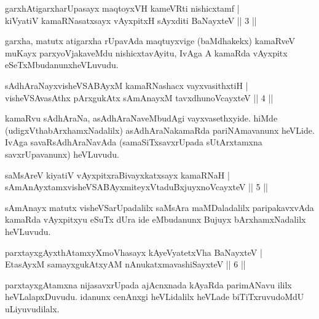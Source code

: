 
\begin{shl}
garxhAtigarxharUpasayx maqtoyxVH kameVRti nishicxtamf |\\
kiVyatiV kamaRNasatxsayx vAyxpitxH sAyxditi BaNayxteV \hfill || 3 ||
\end{shl}

\begin{artha}
garxha, matutx atigarxha rUpavAda maqtuyxvige (baMdhakekx) kamaRveV muKayx parxyoVjakaveMdu nishicxtavAyitu, IvAga A kamaRda vAyxpitx eSeTxMbudanunx\break heVLuvudu.
\end{artha}

\begin{shl}
sAdhAraNayxvisheVSABAyxM kamaRNashacx vayxvasithxtiH |\\
visheVSAvasAthx pArxgukAtx sAmAnayxM tavxdhunoVcayxteV \hfill || 4 ||
\end{shl}

\begin{artha}
kamaRvu sAdhAraNa, asAdhAraNaveMbudAgi vayxvasethxyide. hiMde (udigxVtha\-bArxhamxNadalilx) asAdhAraNakamaRda pariNAmavanunx heVLide. IvAga savaRsAdhAraNavAda (samaSiTxsavxrUpada sUtArxtamxna savxrUpavanunx) heVLuvudu.
\end{artha}


\begin{shl}
saMsAreV kiyatiV vAyxpitxraBivayxkatxsayx kamaRNaH |\\
sAmAnAyxtamxvisheVSABAyxmiteyxVtaduBxjuyxnoVcayxteV \hfill || 5 ||
\end{shl}

\begin{artha}
sAmAnayx matutx visheVSarUpadalilx saMsAra maMDaladalilx paripakavxvAda kamaRda vAyxpitxyu eSuTx dUra ide eMbudanunx Bujuyx bArxhamxNadalilx heVLuvudu.
\end{artha}

\begin{shl}
parxtayxgAyxthAtamxyXmoVhasayx kAyeVyatetxVha BaNayxteV |\\
EtasAyxM samayxgukAtxyAM nAnukatxmavashiSayxteV \hfill || 6 ||
\end{shl}

\begin{artha}
parxtayxgAtamxna nijasavxrUpada ajAcnxnada kAyaRda parimANavu ililx heVLalapxDuvudu. idanunx cenAnxgi heVLidalilx heVLade biTiTxruvudoMdU uLiyuvudilalx.
\end{artha}

